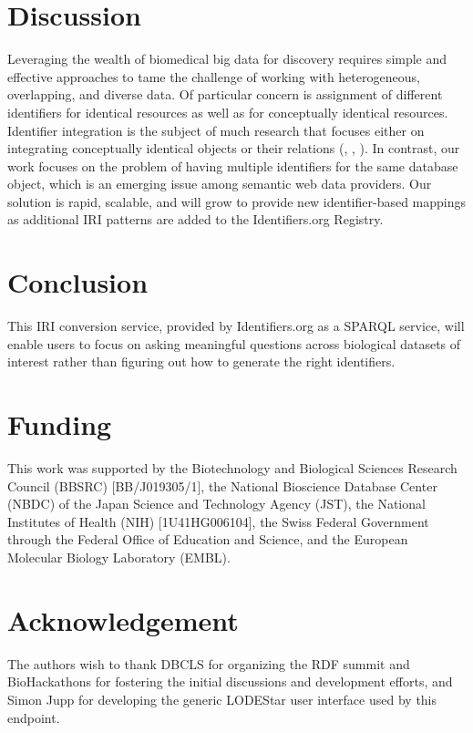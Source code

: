 \documentclass{bioinfo}
\begin{document}
\section{Discussion}
Leveraging the wealth of biomedical big data for discovery requires simple and effective approaches to tame the challenge of working with heterogeneous, overlapping, and diverse data. Of particular concern is assignment of different identifiers for identical resources as well as for conceptually identical resources. Identifier integration is the subject of much research that focuses either on integrating conceptually identical objects or their relations (\cite{VanIersel2010}, \cite{Wein2012}, \cite{Chambers2013}). In contrast, our work focuses on the problem of having multiple identifiers for the same database object, which is an emerging issue among semantic web data providers. Our solution is rapid, scalable, and will grow to provide new identifier-based mappings as additional IRI patterns are added to the Identifiers.org Registry.

\section{Conclusion}
This IRI conversion service, provided by Identifiers.org as a SPARQL service, will enable users to focus on asking meaningful questions across biological datasets of interest rather than figuring out how to generate the right identifiers.

\section{Funding} 
This work was supported by the Biotechnology and Biological Sciences Research Council (BBSRC) [BB/J019305/1], the National Bioscience Database Center (NBDC) of the Japan Science and Technology Agency (JST), the National Institutes of Health (NIH) [1U41HG006104], the Swiss Federal Government through the Federal Office of Education and Science, and the European Molecular Biology Laboratory (EMBL).  

\section*{Acknowledgement}
The authors wish to thank DBCLS for organizing the RDF summit and BioHackathons for fostering the initial discussions and development efforts, and Simon Jupp for developing the generic LODEStar user interface used by this endpoint.


%
%
%
%
%
%
  
\end{document}
